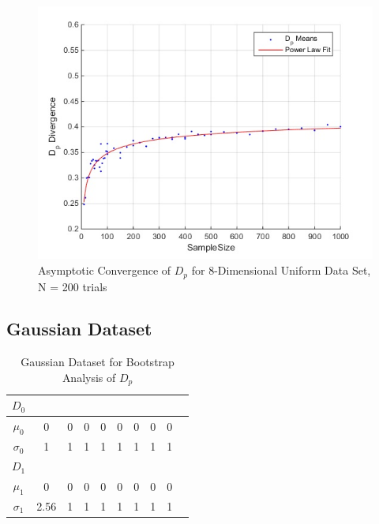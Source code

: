 \documentclass{article}
\begin{document}
	\begin{figure}[h!]
		\caption{Asymptotic Convergence of $D_p$ for 8-Dimensional Uniform Data Set, N = 200 trials}
		\centering
		\includegraphics[scale=0.6]{dp_n50_uniform}
	\end{figure}	
	

	\subsection*{\small Gaussian Dataset}
	\begin{table}[!h]
		\caption{Gaussian Dataset for Bootstrap Analysis of $D_p$}
		\centering %
		\begin{tabular}{c c c c c c c c c c} %
			$D_0$ &  &  &  \\ [0.5ex] %
			\hline %
			$\mu_0$ & 0 & 0 & 0 & 0 & 0 & 0 & 0 & 0\\[0.5ex] %
			$\sigma_0$ & 1 & 1 & 1 & 1 & 1 & 1 & 1 & 1\\[0.5ex]
			
			$D_1$ & \\ [0.5ex]
			
			\hline
			$\mu_1$ & 0 & 0 & 0 & 0 & 0 & 0 & 0 & 0\\[0.5ex] %
			$\sigma_1$ & 2.56 & 1 & 1 & 1 & 1 & 1 & 1 & 1\\[0.5ex]
			\hline %
		\end{tabular}
		\label{table:nonlin} %
	\end{table}
			
\end{document}
